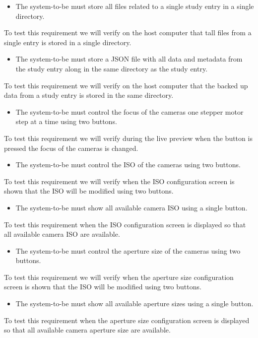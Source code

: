 \begin{itemize}
    \item The system-to-be must store all files related to a single study entry in a single directory.
\end{itemize}
To test this requirement we will verify on the host computer that tall files from a single entry is stored in a single directory.
\begin{itemize}
    \item The system-to-be must store a JSON file with all data and metadata from the study entry along in the same directory as the study entry.
\end{itemize}
To test this requirement we will verify on the host computer that the backed up data from a study entry is stored in the same directory.
\begin{itemize}
    \item The system-to-be must control the focus of the cameras one stepper motor step at a time using two buttons.
\end{itemize}
To test this requirement we will verify during the live preview when the button is pressed the focus of the cameras is changed.
\begin{itemize}
    \item The system-to-be must control the ISO of the cameras using two buttons.
\end{itemize}
To test this requirement we will verify when the ISO configuration screen is shown that the ISO will be modified using two buttons.
\begin{itemize}
    \item The system-to-be must show all available camera ISO using a single button.
\end{itemize}
To test this requirement when the ISO configuration screen is displayed so that all available camera ISO are available.
\begin{itemize}
    \item The system-to-be must control the aperture size of the cameras using two buttons.
\end{itemize}
To test this requirement we will verify when the aperture size configuration screen is shown that the ISO will be modified using two buttons.
\begin{itemize}
    \item The system-to-be must show all available aperture sizes using a single button.
\end{itemize}
To test this requirement when the aperture size configuration screen is displayed so that all available camera aperture size are available.
